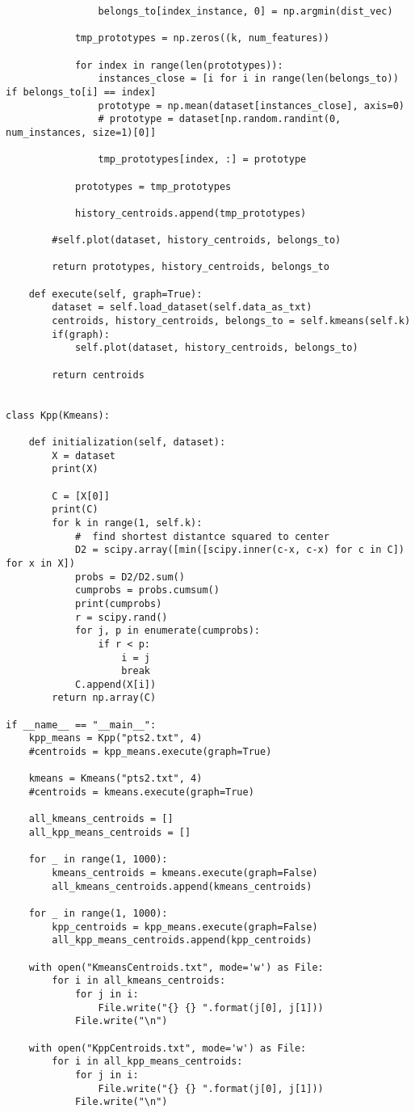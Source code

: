 \begin{verbatim}
                belongs_to[index_instance, 0] = np.argmin(dist_vec)

            tmp_prototypes = np.zeros((k, num_features))

            for index in range(len(prototypes)):
                instances_close = [i for i in range(len(belongs_to)) if belongs_to[i] == index]
                prototype = np.mean(dataset[instances_close], axis=0)
                # prototype = dataset[np.random.randint(0, num_instances, size=1)[0]]

                tmp_prototypes[index, :] = prototype

            prototypes = tmp_prototypes

            history_centroids.append(tmp_prototypes)

        #self.plot(dataset, history_centroids, belongs_to)

        return prototypes, history_centroids, belongs_to

    def execute(self, graph=True):
        dataset = self.load_dataset(self.data_as_txt)
        centroids, history_centroids, belongs_to = self.kmeans(self.k)
        if(graph):
            self.plot(dataset, history_centroids, belongs_to)

        return centroids


class Kpp(Kmeans):

    def initialization(self, dataset):
        X = dataset
        print(X)

        C = [X[0]]
        print(C)
        for k in range(1, self.k):
            #  find shortest distantce squared to center
            D2 = scipy.array([min([scipy.inner(c-x, c-x) for c in C]) for x in X])
            probs = D2/D2.sum()
            cumprobs = probs.cumsum()
            print(cumprobs)
            r = scipy.rand()
            for j, p in enumerate(cumprobs):
                if r < p:
                    i = j
                    break
            C.append(X[i])
        return np.array(C)

if __name__ == "__main__":
    kpp_means = Kpp("pts2.txt", 4)
    #centroids = kpp_means.execute(graph=True)

    kmeans = Kmeans("pts2.txt", 4)
    #centroids = kmeans.execute(graph=True)

    all_kmeans_centroids = []
    all_kpp_means_centroids = []

    for _ in range(1, 1000):
        kmeans_centroids = kmeans.execute(graph=False)
        all_kmeans_centroids.append(kmeans_centroids)

    for _ in range(1, 1000):
        kpp_centroids = kpp_means.execute(graph=False)
        all_kpp_means_centroids.append(kpp_centroids)

    with open("KmeansCentroids.txt", mode='w') as File:
        for i in all_kmeans_centroids:
            for j in i:
                File.write("{} {} ".format(j[0], j[1]))
            File.write("\n")

    with open("KppCentroids.txt", mode='w') as File:
        for i in all_kpp_means_centroids:
            for j in i:
                File.write("{} {} ".format(j[0], j[1]))
            File.write("\n")
\end{verbatim}

